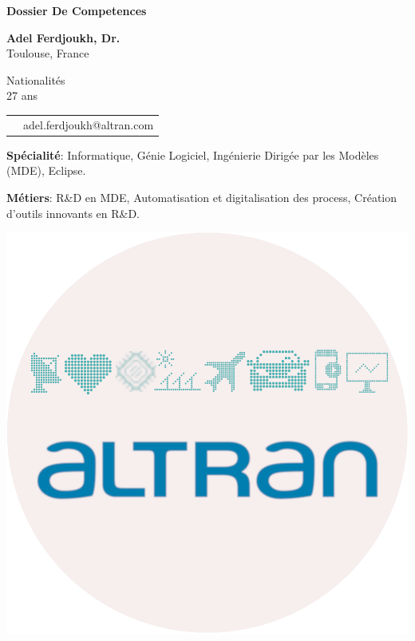 \thispagestyle{empty}

\renewcommand\refname{~}

\begin{center}
\par\textbf{\huge \sc Dossier De Competences}
\end{center}

\vspace{.5cm}

\begin{minipage}{0.45\textwidth}
\textbf{Adel Ferdjoukh, Dr.} \\ 
Toulouse, France

\vspace{.3cm}

Nationalités \fr{} \dz{} \kab{} \\
27 ans \\

\begin{tabular}{cl}
\email{} & adel.ferdjoukh@altran.com\\
\end{tabular}

\medskip
{\bf Spécialité}: Informatique, Génie Logiciel, Ingénierie Dirigée par les Modèles (MDE), Eclipse.

\medskip
{\bf Métiers}: R\&D en MDE, Automatisation et digitalisation des process, Création d’outils innovants en R\&D.


\end{minipage}
\hfill
\begin{minipage}{0.45\textwidth}
\begin{flushright}
\includegraphics[scale=0.8]{img/altran.png}~~~~~~~~
\end{flushright}
\end{minipage}


